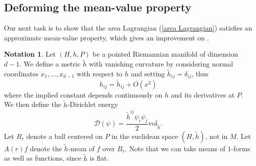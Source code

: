 \documentclass[reqno,12pt,letterpaper]{amsart}
\newcommand{\DirL}{\mathscr D}
\newcommand{\vol}{\mathrm{vol}}
\theoremstyle{definition}
\newtheorem{notation}[theorem]{Notation}
\numberwithin{equation}{section}
\begin{document}

\subsection{Deforming the mean-value property}
Our next task is to show that the area Lagrangian (\ref{area Lagrangian}) satisfies an approximate mean-value property, which gives an improvement on \cite[Teorema 4.3]{Miranda66}.

\begin{notation}
Let $(H, h, P)$ be a pointed Riemannian manifold of dimension $d - 1$.
We define a metric $\tilde h$ with vanishing curvature by considering normal coordinates $x_1, \dots, x_{d - 1}$ with respect to $h$ and setting $\tilde h_{ij} = \delta_{ij}$, thus
$$h_{ij} = \tilde h_{ij} + O(x^2)$$
where the implied constant depends continuously on $h$ and its derivatives at $P$.
We then define the $\tilde h$-Dirichlet energy
$$\DirL(\psi) = \frac{\tilde h^{ij} \psi_i \psi_j}{2}\vol_{\tilde h}.$$
Let $B_r$ denote a ball centered on $P$ in the euclidean space $(H, \tilde h)$, not in $M$.
Let $A(r)f$ denote the $\tilde h$-mean of $f$ over $B_r$.
Note that we can take means of $1$-forms as well as functions, since $\tilde h$ is flat.
\end{notation}
\end{document}
